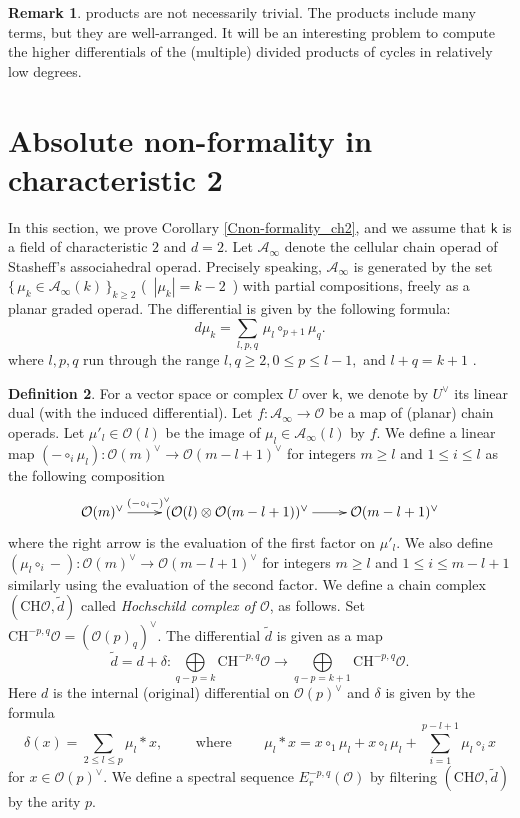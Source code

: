 \documentclass[reqno]{amsart}
\theoremstyle{definition}
\newtheorem{defi}{Definition}[section]
\newtheorem{rem}[defi]{Remark}
\theoremstyle{plain}
\newcommand{\oper}{\mathcal{O}}%
\newcommand{\ASS}{\mathcal{A}}%
\newcommand{\Hoch}{\mathrm{CH}}
\newcommand{\kk}{\mathsf{k}}
\begin{document}
\begin{rem}
products are not necessarily  trivial. The products include many terms, but they are well-arranged. It will be an interesting problem to  compute the higher differentials of the (multiple) divided products of cycles in relatively low degrees.
\end{rem}

\section{Absolute non-formality in characteristic 2}\label{Sabsolute}
In this section, we prove Corollary \ref{Cnon-formality_ch2}, and we assume that $\kk$ is a field of characteristic $2$ and $d=2$. Let $\ASS_\infty$ denote the cellular chain operad of Stasheff's associahedral operad. Precisely speaking,  
$\ASS_\infty$ is generated by the set $\{\, \mu_k\in \ASS_\infty(k) \, \}_{k\geq 2}$ (\ $|\mu_k|=k-2$\ )  with partial compositions, freely as a planar graded operad. The differential is given by the following formula:
\[
d\mu _k=\sum_{
l,p,q}\,\mu_l\circ_{p+1}\mu_q.
\]
where $l,p,q$ run through the range $l, q\geq 2, 0\leq p\leq l-1,$ and $l+q=k+1$ .
\begin{defi}\label{Dhochschild}
For a vector space or complex  $U$ over $\kk$, we denote by $U^\vee$  its linear dual (with the induced differential). Let $f:\ASS_\infty\to \oper$ be a map of (planar) chain operads. Let $\mu'_l\in \oper(l)$ be the image of $\mu_l\in\ASS_\infty(l)$ by $f$. We define a linear map $(-\circ_i\mu_l):\oper(m)^\vee\to \oper(m-l+1)^\vee$ for integers $m\geq l$ and $1\leq i\leq l$ as the following composition
\[
\xymatrix{\oper(m)^\vee\ar[r]^{(-\circ_i-)^\vee\quad \qquad}& (\oper(l)\otimes\oper(m-l+1))^\vee\ar[r]& \oper(m-l+1)^\vee }
\] 
where the right arrow is the evaluation of the first factor on  $\mu'_l$. We also define $(\mu_l\circ_i-): \oper(m)^\vee\to \oper(m-l+1)^\vee$ for integers $m\geq l$ and $1\leq i\leq m-l+1$ similarly using the evaluation of the second factor. 
We define a chain complex  $(\Hoch\oper, \tilde d)$ called \textit{Hochschild complex of $\oper$},  as follows.
Set $\Hoch^{-p,q}\oper=(\oper (p)_q)^\vee$.  The  differential $\tilde d$ is given as a map
\[
\tilde d =d+\delta : \underset{q-p=k}{\bigoplus}\Hoch^{-p,q} \oper \longrightarrow \underset{q-p=k+1}{\bigoplus}\Hoch^{-p,q} \oper.
\] 
Here $d$ is the internal (original) differential on $\oper(p)^\vee$ and $\delta$ is given by the  formula 
\[
\delta (x)=\sum_{ 2\leq l\leq p}\mu_l* x,\qquad \text{ where }\qquad \mu_l*x=x\circ_1\mu_l+x\circ_l\mu_l+\sum_{i=1}^{p-l+1}\mu_l\circ_ix
\]
for $x\in \oper (p)^\vee$. We define a  spectral sequence $E^{-p,q}_r(\oper)$ by filtering $(\Hoch\oper, \tilde d)$ by the arity $p$.
\end{defi}
\end{document}
